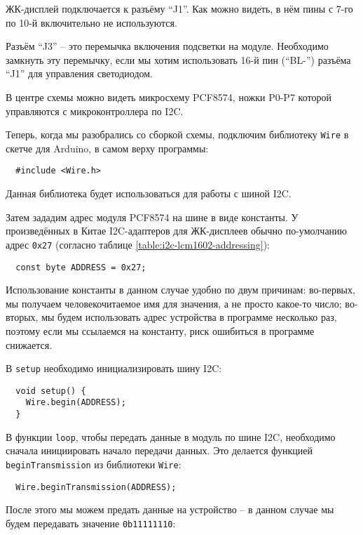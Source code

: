 \documentclass[../sparc.tex]{subfiles}
\begin{document}
ЖК-дисплей подключается к разъёму ``J1''.  Как можно видеть, в нём пины с 7-го
по 10-й включительно не используются.

Разъём ``J3'' -- это перемычка включения подсветки на модуле.  Необходимо
замкнуть эту перемычку, если мы хотим использовать 16-й пин (``BL-'') разъёма
``J1'' для управления светодиодом.

В центре схемы можно видеть микросхему PCF8574, ножки P0-P7 которой управляются
с микроконтроллера по I2C.

Теперь, когда мы разобрались со сборкой схемы, подключим библиотеку
\texttt{Wire} в скетче для Arduino, в самом верху программы:

\begin{verbatim}
  #include <Wire.h>
\end{verbatim}

Данная библиотека будет использоваться для работы с шиной I2C.

Затем зададим адрес модуля PCF8574 на шине в виде константы.  У произведённых в
Китае I2C-адаптеров для ЖК-дисплеев обычно по-умолчанию адрес \texttt{0x27}
(согласно таблице \ref{table:i2c-lcm1602-addressing}):

\begin{verbatim}
  const byte ADDRESS = 0x27;
\end{verbatim}

Использование константы в данном случае удобно по двум причинам: во-первых, мы
получаем человекочитаемое имя для значения, а не просто какое-то число;
во-вторых, мы будем использовать адрес устройства в программе несколько раз,
поэтому если мы ссылаемся на константу, риск ошибиться в программе снижается.

В \texttt{setup} необходимо инициализировать шину I2C:

\begin{verbatim}
  void setup() {
    Wire.begin(ADDRESS);
  }
\end{verbatim}

В функции \texttt{loop}, чтобы передать данные в модуль по шине I2C, необходимо
сначала инициировать начало передачи данных.  Это делается функцией
\texttt{beginTransmission} из библиотеки \texttt{Wire}:

\begin{verbatim}
  Wire.beginTransmission(ADDRESS);
\end{verbatim}

После этого мы можем предать данные на устройство -- в данном случае мы будем
передавать значение \texttt{0b11111110}:
\end{document}
